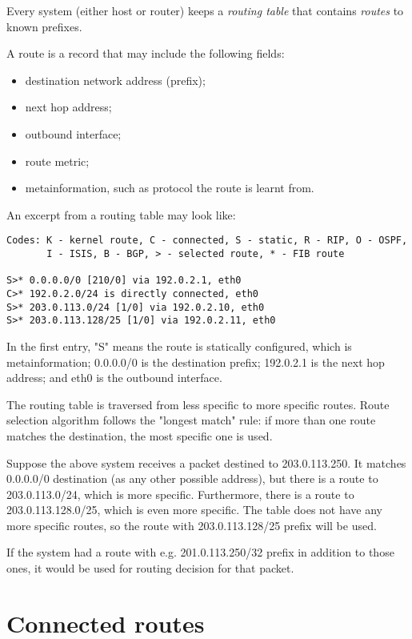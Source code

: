 Every system (either host or router) keeps a \emph{routing table} that contains \emph{routes} to known prefixes.

A route is a record that may include the following fields:
\begin{itemize}
  \item destination network address (prefix);
  \item next hop address;
  \item outbound interface;
  \item route metric;
  \item metainformation, such as protocol the route is learnt from.
\end{itemize}

An excerpt from a routing table may look like:
\begin{verbatim}
Codes: K - kernel route, C - connected, S - static, R - RIP, O - OSPF,
       I - ISIS, B - BGP, > - selected route, * - FIB route

S>* 0.0.0.0/0 [210/0] via 192.0.2.1, eth0
C>* 192.0.2.0/24 is directly connected, eth0
S>* 203.0.113.0/24 [1/0] via 192.0.2.10, eth0
S>* 203.0.113.128/25 [1/0] via 192.0.2.11, eth0
\end{verbatim}

In the first entry, "S" means the route is statically configured, which is metainformation;
0.0.0.0/0 is the destination prefix; 192.0.2.1 is the next hop address; and eth0 is the
outbound interface.

The routing table is traversed from less specific to more specific routes. Route selection
algorithm follows the "longest match" rule: if more than one route matches the destination,
the most specific one is used.

Suppose the above system receives a packet destined to 203.0.113.250. It matches 0.0.0.0/0
destination (as any other possible address), but there is a route to 203.0.113.0/24, which is
more specific. Furthermore, there is a route to 203.0.113.128.0/25, which is even more specific.
The table does not have any more specific routes, so the route with 203.0.113.128/25 prefix 
will be used.

If the system had a route with e.g. 201.0.113.250/32 prefix in addition to those ones, it would
be used for routing decision for that packet.



\section{Connected routes}


